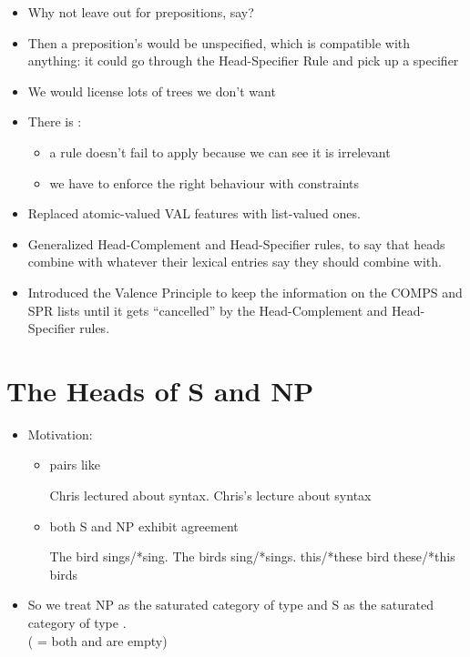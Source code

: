\documentclass[a4paper,landscape,headrule,footrule]{foils}
\begin{document}
\begin{itemize}
\item Why not leave  out for prepositions, say?
\item Then a preposition's  would be unspecified, which is
  compatible with anything: it could go through the Head-Specifier
  Rule and pick up a specifier
\item We would license lots of trees we don't want
\item There is :
  \begin{itemize}
  \item a rule doesn't fail to apply because we can see it is
    irrelevant
  \item we have to enforce the right behaviour with constraints
  \end{itemize}
\end{itemize}

\begin{itemize}
\item Replaced atomic-valued VAL features with list-valued
ones.
\item Generalized Head-Complement and Head-Specifier
rules, to say that heads combine with whatever their
lexical entries say they should combine with.
\item Introduced the Valence Principle to keep the information on the
  COMPS and SPR lists until it gets ``cancelled'' by the
  Head-Complement and Head-Specifier rules.
\end{itemize}

\section{The Heads of S and NP}

\begin{itemize}
\item Motivation:
\begin{itemize}
  \item pairs like 
    \begin{exe}
      \ix Chris lectured about syntax.
      \ix Chris’s lecture about syntax
    \end{exe}
  \item both S and NP exhibit agreement
 \begin{exe}
   \ix The bird sings/*sing.
   \ix The birds sing/*sings.
   \ix this/*these bird 
   \ix these/*this birds
\end{exe}
\end{itemize}
\item So we treat NP as the saturated category of type 
and S as the saturated category of type .
\\ ( = both  and  are empty)
\end{itemize}
\end{document}
